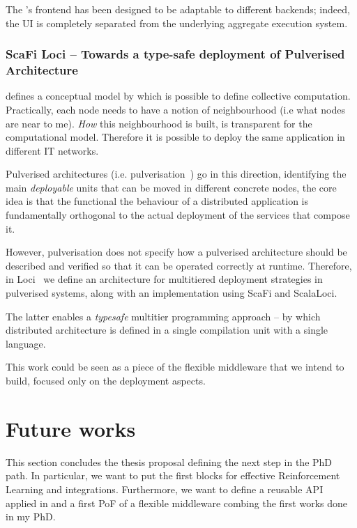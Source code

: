 \documentclass[11pt]{article}
\begin{document}
The \scafiweb{}'s frontend has been designed to be adaptable to different backends; indeed, the UI is completely separated from the underlying aggregate execution system. 

\subsubsection{ScaFi Loci -- Towards a type-safe deployment of Pulverised Architecture}
\ac{} defines a conceptual model by which is possible to define collective computation. Practically, each node needs to have a notion of neighbourhood (i.e what nodes are near to me). \textit{How} this neighbourhood is built, is transparent for the computational model. Therefore it is possible to deploy the same application in different IT networks.

Pulverised architectures (i.e. pulverisation~\cite{DBLP:journals/fi/CasadeiPPVW20}) go in this direction, identifying the main \textit{deployable} units that can be moved in different concrete nodes, the core idea is that the functional
the behaviour of a distributed application is fundamentally orthogonal to the actual deployment of the services that compose it.

However, pulverisation does not specify how a pulverised architecture should
be described and verified so that it can be operated correctly
at runtime.
Therefore, in \scafi{} Loci~\cite{DBLP:conf/acsos/AguzziCPSV21} we define an architecture for multitiered deployment strategies in pulverised systems, along with an implementation using ScaFi and ScalaLoci.

The latter enables a \textit{typesafe} multitier programming approach -- by which distributed architecture is defined
in a single compilation unit with a single language.

This work could be seen as a piece of the flexible middleware that we intend to build, focused only on the deployment aspects.

\section{Future works}\label{future}
This section concludes the thesis proposal defining the next step in the PhD path. In particular, we want to put the first blocks for effective Reinforcement Learning and \acfull{} integrations. Furthermore, we want to define a reusable API applied in \cpsw{} and a first PoF of a flexible middleware combing the first works done in my PhD. 
\end{document}
